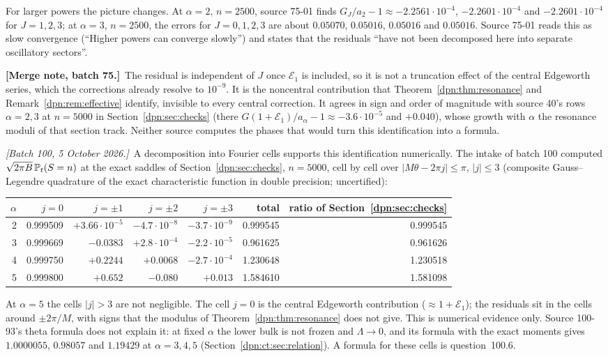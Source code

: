 \documentclass[11pt]{article}
\numberwithin{equation}{section}
\theoremstyle{definition}\newtheorem{definition}[theorem]{Definition}
\theoremstyle{remark}\newtheorem{remark}[theorem]{Remark}
\newcommand{\mergenoteb}[1]{\par\smallskip\noindent\textbf{[Merge note, batch 75.]}\ #1\par\smallskip}
\newcommand{\writenoted}[1]{\par\smallskip\noindent\textit{[Batch 100, 5 October 2026.]}\ #1\par\smallskip}
\begin{document}
For larger powers the picture changes.  At $\alpha=2$, $n=2500$, source 75-01
finds $G_J/a_2-1\approx-2.2561\cdot10^{-4}$, $-2.2601\cdot10^{-4}$ and
$-2.2601\cdot10^{-4}$ for $J=1,2,3$; at $\alpha=3$, $n=2500$, the errors for
$J=0,1,2,3$ are about $0.05070$, $0.05016$, $0.05016$ and $0.05016$.  Source
75-01 reads this as slow convergence (``Higher powers can converge slowly'')
and states that the residuals ``have not been decomposed here into separate
oscillatory sectors''.
\mergenoteb{The residual is independent of $J$ once $\mathcal E_1$ is included,
so it is not a truncation effect of the central Edgeworth series, which the
corrections already resolve to $10^{-9}$.  It is the noncentral contribution
that Theorem~\ref{dpn:thm:resonance} and Remark~\ref{dpn:rem:effective}
identify, invisible to every central correction.  It agrees in sign and
order of magnitude with source 40's rows $\alpha=2,3$ at $n=5000$ in
Section~\ref{dpn:sec:checks} (there $G(1+\mathcal E_1)/a_\alpha-1\approx
-3.6\cdot10^{-5}$ and $+0.040$), whose growth with $\alpha$ the resonance moduli
of that section track.  Neither source computes the phases that would turn
this identification into a formula.}
\writenoted{A decomposition into Fourier cells supports this identification
numerically.  The intake of batch 100 computed $\sqrt{2\pi B}\,\mathbb P_t(S=n)$ at
the exact saddles of Section~\ref{dpn:sec:checks}, $n=5000$, cell by cell over
$|M\theta-2\pi j|\le\pi$, $|j|\le3$ (composite Gauss--Legendre quadrature of the
exact characteristic function in double precision; uncertified):
\begin{center}
\small
\begin{tabular}{rrrrrrr}
\toprule
$\alpha$ & $j=0$ & $j=\pm1$ & $j=\pm2$ & $j=\pm3$ & total & ratio of Section~\ref{dpn:sec:checks}\\
\midrule
2 & 0.999509 & $+3.66\cdot10^{-5}$ & $-4.7\cdot10^{-8}$ & $-3.7\cdot10^{-9}$ & 0.999545 & 0.999545\\
3 & 0.999669 & $-0.0383$ & $+2.8\cdot10^{-4}$ & $-2.2\cdot10^{-5}$ & 0.961625 & 0.961626\\
4 & 0.999750 & $+0.2244$ & $+0.0068$ & $-2.7\cdot10^{-4}$ & 1.230648 & 1.230518\\
5 & 0.999800 & $+0.652$ & $-0.080$ & $+0.013$ & 1.584610 & 1.581098\\
\bottomrule
\end{tabular}
\end{center}
At $\alpha=5$ the cells $|j|>3$ are not negligible.  The cell $j=0$ is the
central Edgeworth contribution ($\approx1+\mathcal E_1$); the residuals sit
in the cells around $\pm2\pi/M$, with signs that the modulus of
Theorem~\ref{dpn:thm:resonance} does not give.  This is numerical evidence
only.  Source 100-93's theta formula does not explain it: at fixed $\alpha$ the
lower bulk is not frozen and $\Lambda\to0$, and its formula with the exact
moments gives $1.0000055$, $0.98057$ and $1.19429$ at $\alpha=3,4,5$
(Section~\ref{dpn:ct:sec:relation}).  A formula for these cells is
question~100.6.}
\end{document}

